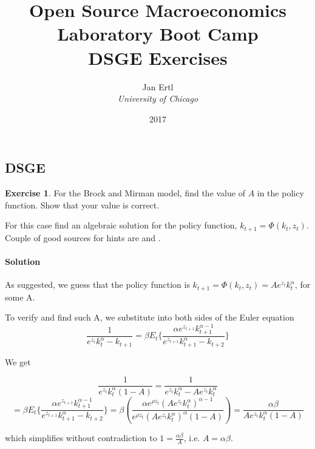\documentclass[letterpaper,12pt]{article}
\theoremstyle{definition}
\newtheorem{exercise}[theorem]{Exercise}
\begin{document}
\begin{titlepage}
	\title{Open Source Macroeconomics Laboratory Boot Camp \\ DSGE Exercises}  %
	\author{Jan Ertl\\ \emph{University of Chicago}}
	\date{\LARGE{2017}}
	\maketitle
\end{titlepage}

\begin{spacing}{1.5}


\section*{DSGE}\label{DSGE_HW}

	\begin{exercise} \label{DSGE_HW_BM_FindA}
		For the Brock and Mirman model, find the value of $A$ in the policy function.  Show that your value is correct.

		For this case find an algebraic solution for the policy function, $k_{t+1} = \Phi (k_t,z_t)$.  Couple of good sources for hints are \citet[exercise 2.2, p. 12]{StokeyLucas1989} and \citet[exercise 1.1, p. 47]{Sargent1987}.
	\end{exercise}

\paragraph{Solution} As suggested, we guess that the policy function is $k_{t+1} = \Phi (k_t,z_t) 
= Ae^{z_t}k_t^{\alpha}$, for some A.

To verify and find such A, we substitute into both sides of the Euler equation
$$ \frac{1}{e^{z_t}k_t^\alpha-k_{t+1}} = \beta E_t\{\frac{\alpha e^{z_{t+1}} k_{t+1}^{\alpha-1}}{e^{z_{t+1}}k_{t+1}^\alpha-k_{t+2}}\}$$

We get 

$$ \frac{1}{e^{z_t}k_t^{\alpha}(1-A)} = \frac{1}{e^{z_t}k_t^\alpha-Ae^{z_t}k_t^{\alpha}} $$
$$= \beta E_t\{\frac{\alpha e^{z_{t+1}} k_{t+1}^{\alpha-1}}{e^{z_{t+1}}k_{t+1}^\alpha-k_{t+2}}\} = \beta(\frac{\alpha e^{\rho z_t}(Ae^{z_t}k_t^\alpha)^{\alpha-1}}{e^{\rho z_t}(Ae^{z_t}k_t^\alpha)^{\alpha}(1-A)})
= \frac{\alpha\beta}{Ae^{z_t}k_t^\alpha(1-A)}$$

which simplifies without contradiction to $1 = \frac{\alpha \beta}{A}$, i.e. $A = \alpha \beta$.



\end{spacing}
\end{document}
